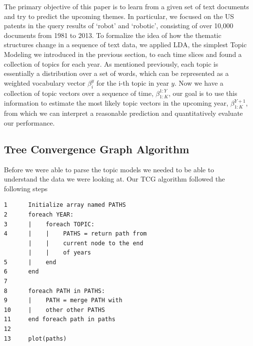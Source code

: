 \documentclass[conference]{IEEEtran}
\begin{document}
The primary objective of this paper is to learn from a given set of text documents and try to predict the upcoming themes. In particular, we focused on the US patents in the query results of `robot' and `robotic', consisting of over 10,000 documents from 1981 to 2013. To formalize the idea of how the thematic structures change in a sequence of text data, we applied LDA\cite{lda2003}, the simplest Topic Modeling we introduced in the previous section, to each time slices and found a collection of topics for each year. As mentioned previously, each topic is essentially a distribution over a set of words, which can be represented as a weighted vocabulary vector $\beta_i^y$ for the i-th topic in year $y$. Now we have a collection of topic vectors over a sequence of time, $\beta_{1:K}^{1:Y}$, our goal is to use this information to estimate the most likely topic vectors in the upcoming year, $\beta_{1:K}^{Y+1}$, from which we can interpret a reasonable prediction and quantitatively evaluate our performance.





\subsection{Tree Convergence Graph Algorithm}
Before we were able to parse the topic models we needed to be able to understand the data we were looking at. Our TCG algorithm followed the following steps 


\begin{verbatim}
1      Initialize array named PATHS
2      foreach YEAR:
3      |    foreach TOPIC:
4      |    |    PATHS = return path from  
       |    |    current node to the end 
       |    |    of years
5      |    end 
6      end 
7     
8      foreach PATH in PATHS:  
9      |    PATH = merge PATH with
10     |    other other PATHS 
11     end foreach path in paths
12    
13     plot(paths)
\end{verbatim}   
\end{document}
